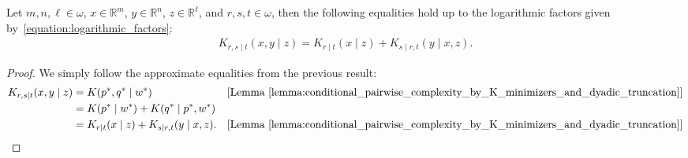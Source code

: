 \begin{theorem}
    \label{theorem:SOI_conditional_complexity_r_s_t}
    Let $m, n, \ell \in \omega$, $x \in \mathbb{R}^m$, $y \in \mathbb{R}^n$, $z \in \mathbb{R}^\ell$, and $r, s, t \in \omega$, then the following equalities hold up to the logarithmic factors given by~\eqref{equation:logarithmic_factors}:
    \begin{align*}
        K_{r, s \mid t}(x, y \mid z) = K_{r \mid t}(x \mid z) + K_{s \mid r, t}(y \mid x, z).
    \end{align*}
\end{theorem}
\begin{proof}
    We simply follow the approximate equalities from the previous result:
    \begin{align*}
        K_{r, s \mid t}(x, y \mid z) &= K(p^*, q^* \mid w^*) & [\text{Lemma~\ref{lemma:conditional_pairwise_complexity_by_K_minimizers_and_dyadic_truncation}}]\\
        &= K(p^* \mid w^*) + K(q^* \mid p^*, w^*)\\
        &= K_{r \mid t}(x \mid z) + K_{s \mid r, t}(y \mid x, z). & [\text{Lemma~\ref{lemma:conditional_pairwise_complexity_by_K_minimizers_and_dyadic_truncation}}]
    \end{align*}
\end{proof}


